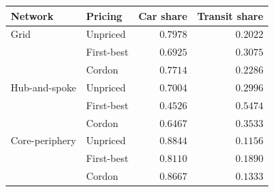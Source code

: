 \begin{tabularx}{0.75\textwidth}{l l R R}
    \toprule
    \textbf{Network} & \textbf{Pricing} & \textbf{Car share} & \textbf{Transit share} \\
    \midrule
    Grid            & Unpriced   & $0.7978$ & $0.2022$ \\
                    & First-best & $0.6925$ & $0.3075$ \\
                    & Cordon     & $0.7714$ & $0.2286$ \\
    \midrule
    Hub-and-spoke   & Unpriced   & $0.7004$ & $0.2996$ \\
                    & First-best & $0.4526$ & $0.5474$ \\
                    & Cordon     & $0.6467$ & $0.3533$ \\
    \midrule
    Core-periphery  & Unpriced   & $0.8844$ & $0.1156$ \\
                    & First-best & $0.8110$ & $0.1890$ \\
                    & Cordon     & $0.8667$ & $0.1333$ \\
    \bottomrule
\end{tabularx}